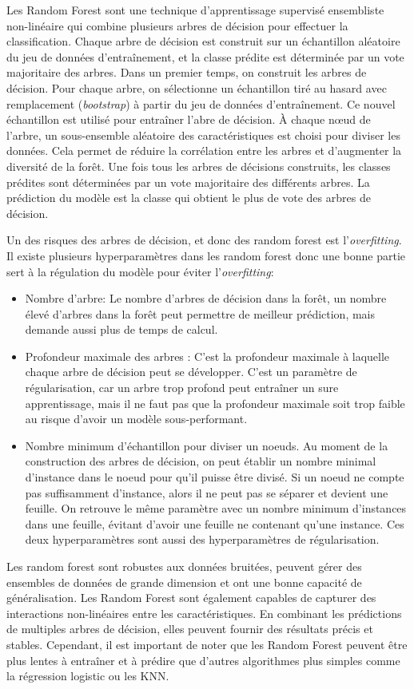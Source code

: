 Les Random Forest sont une technique d'apprentissage supervisé ensembliste non-linéaire qui combine plusieurs arbres de décision pour effectuer la classification. Chaque arbre de décision est construit sur un échantillon aléatoire du jeu de données d'entraînement, et la classe prédite est déterminée par un vote majoritaire des arbres.
Dans un premier temps, on construit les arbres de décision. Pour chaque arbre, on sélectionne un échantillon tiré au hasard avec remplacement (\textit{bootstrap}) à partir du jeu de données d'entraînement. Ce nouvel échantillon est utilisé pour entraîner l'abre de décision. À chaque nœud de l'arbre, un sous-ensemble aléatoire des caractéristiques est choisi pour diviser les données. Cela permet de réduire la corrélation entre les arbres et d'augmenter la diversité de la forêt.
Une fois tous les arbres de décisions construits, les classes prédites sont déterminées par un vote majoritaire des différents arbres. La prédiction du modèle est la classe qui obtient le plus de vote des arbres de décision.

Un des risques des arbres de décision, et donc des random forest est l'\textit{overfitting}. Il existe plusieurs hyperparamètres dans les random forest donc une bonne partie sert à la régulation du modèle pour éviter l'\textit{overfitting}:
\begin{itemize}
\item Nombre d'arbre: Le nombre d'arbres de décision dans la forêt, un nombre élevé d'arbres dans la forêt peut permettre de meilleur prédiction, mais demande aussi plus de temps de calcul.
\item Profondeur maximale des arbres : C'est la profondeur maximale à laquelle chaque arbre de décision peut se développer. C'est un paramètre de régularisation, car un arbre trop profond peut entraîner un sure apprentissage, mais il ne faut pas que la profondeur maximale soit trop faible au risque d'avoir un modèle sous-performant.
\item Nombre minimum d'échantillon pour diviser un noeuds. Au moment de la construction des arbres de décision, on peut établir un nombre minimal d'instance dans le noeud pour qu'il puisse être divisé. Si un noeud ne compte pas suffisamment d'instance, alors il ne peut pas se séparer et devient une feuille. On retrouve le même paramètre avec un nombre minimum d'instances dans une feuille, évitant d'avoir une feuille ne contenant qu'une instance. Ces deux hyperparamètres sont aussi des hyperparamètres de régularisation.
\end{itemize}

Les random forest sont robustes aux données bruitées, peuvent gérer des ensembles de données de grande dimension et ont une bonne capacité de généralisation. Les Random Forest sont également capables de capturer des interactions non-linéaires entre les caractéristiques. En combinant les prédictions de multiples arbres de décision, elles peuvent fournir des résultats précis et stables. Cependant, il est important de noter que les Random Forest peuvent être plus lentes à entraîner et à prédire que d'autres algorithmes plus simples comme la régression logistic ou les KNN.